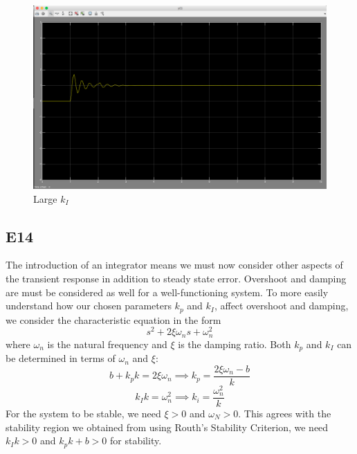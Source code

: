 \documentclass[10pt,titlepage]{article}
\begin{document}
	\begin{figure}[H]
		\centering
		\includegraphics[scale=0.3]{e13-3}
		\caption{Large $k_I$}
	\end{figure}
	
	\subsection*{E14}
		The introduction of an integrator means we must now consider other aspects of the transient response in addition to steady state error. Overshoot and damping are must be considered as well for a well-functioning system. To more easily understand how our chosen parameters $k_p$ and $k_I$, affect overshoot and damping, we consider the characteristic equation in the form 
	\begin{equation}
		s^2+2\xi\omega_ns+\omega_n^2
	\end{equation} 
	where $\omega_n$ is the natural frequency and $\xi$ is the damping ratio.
	Both $k_p$ and $k_I$ can be determined in terms of $\omega_n$ and $\xi$:
	\begin{equation}
		b+k_pk=2\xi \omega_n \implies k_p=\frac{2\xi \omega_n-b}{k}
	\end{equation}
	\begin{equation}
		k_Ik=\omega_n^2 \implies k_i=\frac{\omega_n^2}{k}
	\end{equation}
	For the system to be stable, we need $\xi >0$ and $\omega_N >0$. This agrees with the stability region we obtained from using Routh's Stability Criterion, we need $k_Ik>0$ and $k_pk+b>0$ for stability.
	
\end{document}
